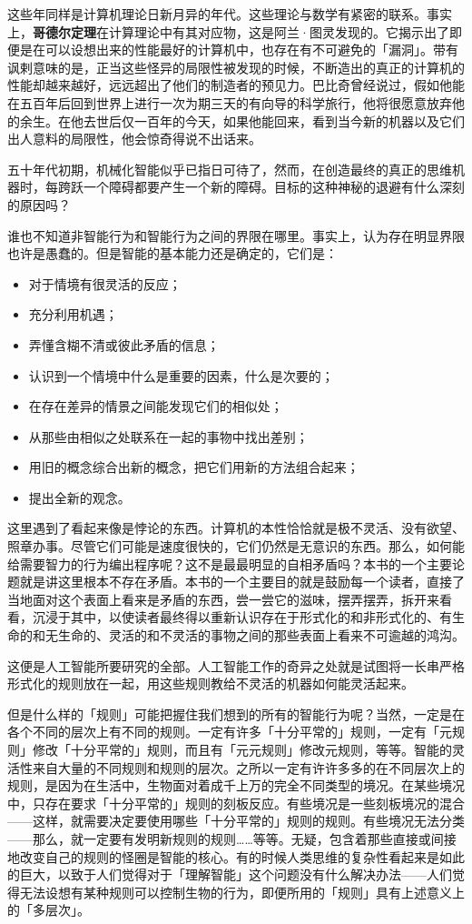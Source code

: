 \documentclass[
  12pt,
  twoside,
  openright,
  oldfontcommands,
]{memoir}
\providecommand{\tightlist}{%
  \setlength{\itemsep}{0pt}\setlength{\parskip}{0pt}}
\newcommand{\heititext}[1]{{\heifamily\bfseries #1}}
\begin{document}
这些年同样是计算机理论日新月异的年代。这些理论与数学有紧密的联系。事实上，\heititext{哥德尔定理}在计算理论中有其对应物，这是阿兰·图灵发现的。它揭示出了即便是在可以设想出来的性能最好的计算机中，也存在有不可避免的「漏洞」。带有讽剌意味的是，正当这些怪异的局限性被发现的时候，不断造出的真正的计算机的性能却越来越好，远远超出了他们的制造者的预见力。巴比奇曾经说过，假如他能在五百年后回到世界上进行一次为期三天的有向导的科学旅行，他将很愿意放弃他的余生。在他去世后仅一百年的今天，如果他能回来，看到当今新的机器以及它们出人意料的局限性，他会惊奇得说不出话来。

五十年代初期，机械化智能似乎已指日可待了，然而，在创造最终的真正的思维机器时，每跨跃一个障碍都要产生一个新的障碍。目标的这种神秘的退避有什么深刻的原因吗？

谁也不知道非智能行为和智能行为之间的界限在哪里。事实上，认为存在明显界限也许是愚蠢的。但是智能的基本能力还是确定的，它们是：

\begin{itemize}
\tightlist
\item
  对于情境有很灵活的反应；
\item
  充分利用机遇；
\item
  弄懂含糊不清或彼此矛盾的信息；
\item
  认识到一个情境中什么是重要的因素，什么是次要的；
\item
  在存在差异的情景之间能发现它们的相似处；
\item
  从那些由相似之处联系在一起的事物中找出差别；
\item
  用旧的概念综合出新的概念，把它们用新的方法组合起来；
\item
  提出全新的观念。
\end{itemize}

这里遇到了看起来像是悖论的东西。计算机的本性恰恰就是极不灵活、没有欲望、照章办事。尽管它们可能是速度很快的，它们仍然是无意识的东西。那么，如何能给需要智力的行为编出程序呢？这不是最最明显的自相矛盾吗？本书的一个主要论题就是讲这里根本不存在矛盾。本书的一个主要目的就是鼓励每一个读者，直接了当地面对这个表面上看来是矛盾的东西，尝一尝它的滋味，摆弄摆弄，拆开来看看，沉浸于其中，以使读者最终得以重新认识存在于形式化的和非形式化的、有生命的和无生命的、灵活的和不灵活的事物之间的那些表面上看来不可逾越的鸿沟。

这便是人工智能所要研究的全部。人工智能工作的奇异之处就是试图将一长串严格形式化的规则放在一起，用这些规则教给不灵活的机器如何能灵活起来。

但是什么样的「规则」可能把握住我们想到的所有的智能行为呢？当然，一定是在各个不同的层次上有不同的规则。一定有许多「十分平常的」规则，一定有「元规则」修改「十分平常的」规则，而且有「元元规则」修改元规则，等等。智能的灵活性来自大量的不同规则和规则的层次。之所以一定有许许多多的在不同层次上的规则，是因为在生活中，生物面对着成千上万的完全不同类型的境况。在某些境况中，只存在要求「十分平常的」规则的刻板反应。有些境况是一些刻板境况的混合------这样，就需要决定要使用哪些「十分平常的」规则的规则。有些境况无法分类------那么，就一定要有发明新规则的规则\ldots\ldots 等等。无疑，包含着那些直接或间接地改变自己的规则的怪圈是智能的核心。有的时候人类思维的复杂性看起来是如此的巨大，以致于人们觉得对于「理解智能」这个问题没有什么解决办法------人们觉得无法设想有某种规则可以控制生物的行为，即便所用的「规则」具有上述意义上的「多层次」。
\end{document}
